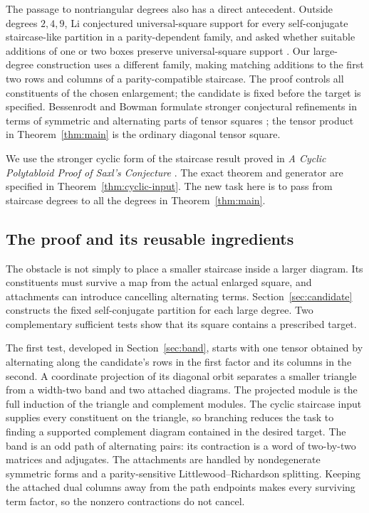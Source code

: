 The passage to nontriangular degrees also has a direct antecedent.
Outside degrees $2,4,9$, Li conjectured universal-square support for every
self-conjugate staircase-like partition in a parity-dependent family,
and asked whether
suitable additions of one or two boxes preserve universal-square support
\cite[Section~5.5, Definition~5.3, Conjecture~1 and Problem~5.4]{Li}.
Our large-degree construction uses a different family, making matching
additions to the first two rows and columns of a parity-compatible
staircase. The proof controls all constituents of the chosen enlargement;
the candidate is fixed before the target is specified.
Bessenrodt and Bowman formulate stronger conjectural refinements in
terms of symmetric and alternating parts of tensor squares
\cite[Conjectures~10.2--10.3]{BessenrodtBowman}; the tensor product in
Theorem~\ref{thm:main} is the ordinary diagonal tensor square.

We use the stronger cyclic form of the staircase result proved in
\emph{A Cyclic Polytabloid Proof of Saxl's Conjecture}
\cite[Theorem~3.1]{SaxlCyclic}.
The exact theorem and generator are specified in
Theorem~\ref{thm:cyclic-input}. The new task here is to pass from staircase
degrees to all the degrees in Theorem~\ref{thm:main}.

\subsection{The proof and its reusable ingredients}

The obstacle is not simply to place a smaller staircase inside a larger
diagram. Its constituents must survive a map from the actual enlarged
square, and attachments can introduce cancelling alternating terms.
Section~\ref{sec:candidate} constructs the fixed self-conjugate partition
for each large degree. Two complementary sufficient tests show that
its square contains a prescribed target.

The first test, developed in Section~\ref{sec:band}, starts with one
tensor obtained by alternating along the candidate's rows in the first
factor and its columns in the second. A coordinate projection of its
diagonal orbit separates a smaller triangle from a width-two band and
two attached diagrams. The projected module is the full induction of
the triangle and complement modules. The cyclic staircase input supplies
every constituent on the triangle, so branching reduces the task to
finding a supported complement diagram contained in the desired target.
The band is an odd path of alternating pairs: its contraction is a word
of two-by-two matrices and adjugates. The attachments are handled by
nondegenerate symmetric forms and a parity-sensitive
Littlewood--Richardson splitting. Keeping the attached dual columns
away from the path endpoints makes every surviving term factor, so the
nonzero contractions do not cancel.

